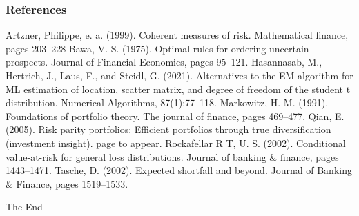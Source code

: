 \documentclass{beamer}
\begin{document}
\begin{frame}
\frametitle{References}
\footnotesize{
\begin{thebibliography}{99} %
 Artzner, Philippe, e. a. (1999). Coherent measures of risk. Mathematical finance, pages 203–228
 Bawa, V. S. (1975). Optimal rules for ordering uncertain prospects. Journal of Financial Economics, pages 95–121.
 Hasannasab, M., Hertrich, J., Laus, F., and Steidl, G. (2021). Alternatives to the EM algorithm for ML estimation of location, scatter matrix, and degree of freedom of the student t distribution. Numerical Algorithms, 87(1):77–118.
 Markowitz, H. M. (1991). Foundations of portfolio theory. The journal of finance, pages 469–477.
 Qian, E. (2005). Risk parity portfolios: Efficient portfolios through true diversification
(investment insight). page to appear.
 Rockafellar R T, U. S. (2002). Conditional value-at-risk for general loss distributions.
Journal of banking $\&$ finance, pages 1443–1471.
 Tasche, D. (2002). Expected shortfall and beyond. Journal of Banking $\&$ Finance, pages 1519–1533.
\end{thebibliography}
}
\end{frame}


\begin{frame}
\Huge{\centerline{The End}}
\end{frame}

\end{document}

